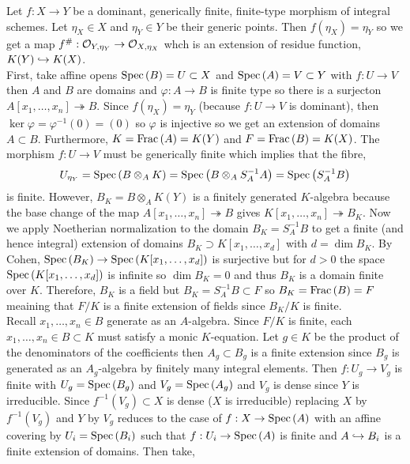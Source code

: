 \documentclass[12pt]{article}
\begin{document}
Let $f : X \to Y$ be a dominant, generically finite, finite-type morphism of integral schemes. Let $\eta_X \in X$ and $\eta_Y \in Y$ be their generic points. Then $f(\eta_X) = \eta_Y$ so we get a map $f^\# : \mathcal{O}_{Y, \eta_Y} \to \mathcal{O}_{X, \eta_X}$ whch is an extension of residue function, $K(Y) \hookrightarrow K(X)$. 
\bigskip\\
First, take affine opens $\mathrm{Spec}\left( B \right) = U \subset X$ and $\mathrm{Spec}\left( A \right) = V \subset Y$ with $f : U \to V$ then $A$ and $B$ are domains and $\varphi : A \to B$ is finite type so there is a surjecton $A[x_1, \dots, x_n] \twoheadrightarrow B$. Since $f(\eta_X) = \eta_Y$ (because $f : U \to V$ is dominant), then $\ker{\varphi} = \varphi^{-1}(0) = (0)$ so $\varphi$ is injective so we get an extension of domains $A \subset B$. Furthermore, $K = \mathrm{Frac}\left(A\right) = K(Y)$ and $F = \mathrm{Frac}\left(B\right) = K(X)$. The morphism $f : U \to V$ must be generically finite which implies that the fibre,
\[ U_{\eta_Y} = \mathrm{Spec}\left( B \otimes_A K \right) = \mathrm{Spec}\left( B \otimes_A S^{-1}_A A \right) = \mathrm{Spec}\left( S_A^{-1} B \right) \]
is finite. However, $B_K = B \otimes_A K(Y)$ is a finitely generated $K$-algebra because the base change of the map $A[x_1, \dots, x_n] \twoheadrightarrow B$ gives $K[x_1, \dots, x_n] \twoheadrightarrow B_K$. Now we apply Noetherian normalization to the domain $B_K = S_A^{-1} B$ to get a finite (and hence integral) extension of domains $B_K \supset K[x_1, \dots, x_d]$ with $d = \dim{B_K}$. By Cohen, $\mathrm{Spec}\left( B_K \right) \to \mathrm{Spec}\left( K[x_1, \dots, x_d] \right)$ is surjective but for $d > 0$ the space $\mathrm{Spec}\left( K[x_1, \dots, x_d] \right)$ is infinite so $\dim{B_K} = 0$ and thus $B_K$ is a domain finite over $K$. Therefore, $B_K$ is a field but $B_K = S_A^{-1} B \subset F$ so $B_K = \mathrm{Frac}\left(B\right) = F$ meaining that $F / K$ is a finite extension of fields since $B_K / K$ is finite. 
\bigskip\\
Recall $x_1, \dots, x_n \in B$ generate as an $A$-algebra. Since $F / K$ is finite, each $x_1, \dots, x_n \in B \subset K$ must satisfy a monic $K$-equation. Let $g \in K$ be the product of the denominators of the coefficients then $A_g \subset B_g$ is a finite extension since $B_g$ is generated as an $A_g$-algebra by finitely many integral elements. Then $f : U_g \to V_g$ is finite with $U_g = \mathrm{Spec}\left( B_g \right)$ and $V_g = \mathrm{Spec}\left( A_g \right)$ and $V_g$ is dense since $Y$ is irreducible. Since $f^{-1}(V_g) \subset X$ is dense ($X$ is irreducible) replacing $X$ by $f^{-1}(V_g)$ and $Y$ by $V_g$ reduces to the case of $f : X \to \mathrm{Spec}\left( A \right)$ with an affine covering by $U_i = \mathrm{Spec}\left( B_i \right)$ such that $f : U_i \to \mathrm{Spec}\left( A \right)$ is finite and $A \hookrightarrow B_i$ is a finite extension of domains. Then take,
\end{document}
